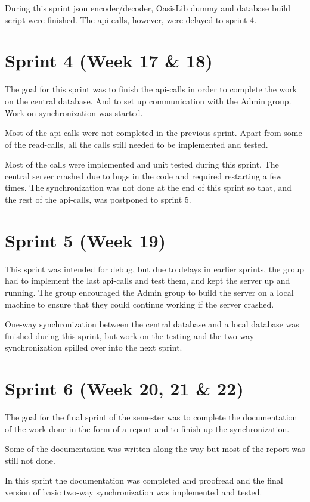 During this sprint \ac{json} encoder/decoder, OasisLib dummy and database build script were finished. The \ac{api}-calls, however, were delayed to sprint 4.

\section{Sprint 4 (Week 17 \& 18)}
The goal for this sprint was to finish the \ac{api}-calls in order to complete the work on the central database. And to set up communication with the Admin group. Work on synchronization was started.

Most of the \ac{api}-calls were not completed in the previous sprint. Apart from some of the read-calls, all the calls still needed to be implemented and tested. 

Most of the calls were implemented and unit tested during this sprint. The central server crashed due to bugs in the code and required restarting a few times. The synchronization was not done at the end of this sprint so that, and the rest of the \ac{api}-calls, was postponed to sprint 5.  

\section{Sprint 5 (Week 19)}
This sprint was intended for debug, but due to delays in earlier sprints, the group had to implement the last \ac{api}-calls and test them, and kept the server up and running. The group encouraged the Admin group to build the server on a local machine to ensure that they could continue working if the server crashed.

One-way synchronization between the central database and a local database was finished during this sprint, but work on the testing and the two-way synchronization spilled over into the next sprint.

\section{Sprint 6 (Week 20, 21 \& 22)}
The goal for the final sprint of the semester was to complete the documentation of the work done in the form of a report and to finish up the synchronization.

Some of the documentation was written along the way but most of the report was still not done. 

In this sprint the documentation was completed and proofread and the final version of basic two-way synchronization was implemented and tested.

